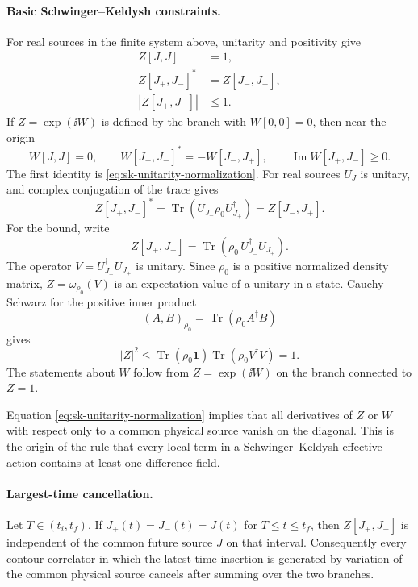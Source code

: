 \paragraph{Basic Schwinger--Keldysh constraints.}
For real sources in the finite system above, unitarity and positivity give
\begin{align}
  Z[J,J]&=1,\\
  Z[J_+,J_-]^*&=Z[J_-,J_+],\\
  |Z[J_+,J_-]|&\leq1 .
\end{align}
If \(Z=\exp(\ii W)\) is defined by the branch with \(W[0,0]=0\), then near
the origin
\[
  W[J,J]=0,\qquad
  W[J_+,J_-]^*=-W[J_-,J_+],\qquad
  \operatorname{Im}W[J_+,J_-]\geq0 .
\]
The first identity is \eqref{eq:sk-unitarity-normalization}.  For real
sources \(U_J\) is unitary, and complex conjugation of the trace gives
\[
  Z[J_+,J_-]^*
  =
  \operatorname{Tr}(U_{J_-}\rho_0U_{J_+}^\dagger)
  =
  Z[J_-,J_+] .
\]
For the bound, write
\[
  Z[J_+,J_-]
  =
  \operatorname{Tr}\!\left(
    \rho_0\,U_{J_-}^\dagger U_{J_+}
  \right).
\]
The operator \(V=U_{J_-}^\dagger U_{J_+}\) is unitary.  Since \(\rho_0\) is a
positive normalized density matrix, \(Z=\omega_{\rho_0}(V)\) is an
expectation value of a unitary in a state.  Cauchy--Schwarz for the positive
inner product
\[
  (A,B)_{\rho_0}=\operatorname{Tr}(\rho_0 A^\dagger B)
\]
gives
\[
  |Z|^2\leq
  \operatorname{Tr}(\rho_0\mathbf 1)
  \operatorname{Tr}(\rho_0 V^\dagger V)=1.
\]
The statements about \(W\) follow from \(Z=\exp(\ii W)\) on the branch
connected to \(Z=1\).

Equation \eqref{eq:sk-unitarity-normalization} implies that all derivatives
of \(Z\) or \(W\) with respect only to a common physical source vanish on the
diagonal.  This is the origin of the rule that every local term in a
Schwinger--Keldysh effective action contains at least one difference field.

\paragraph{Largest-time cancellation.}
Let \(T\in(t_i,t_f)\).  If \(J_+(t)=J_-(t)=J(t)\) for \(T\leq t\leq t_f\),
then \(Z[J_+,J_-]\) is independent of the common future source \(J\) on that
interval.  Consequently every contour correlator in which the latest-time
insertion is generated by variation of the common physical source cancels
after summing over the two branches.

